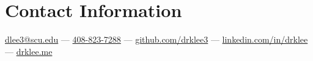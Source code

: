 \section{\sc Contact Information}
\href{mailto:dlee3@scu.edu}{dlee3@scu.edu} ---
\href{tel:408-823-7288}{408-823-7288} ---
\href{https://github.com/drklee3}{github.com/drklee3} ---
\href{https://www.linkedin.com/in/drklee/}{linkedin.com/in/drklee} ---
\href{https://drklee.me}{drklee.me}


